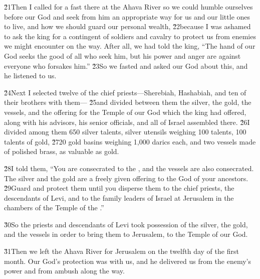 \v{21}Then I called for a fast there at the Ahava River so we could humble ourselves before our God and seek from him an appropriate way for us and our little ones to live, and how we should guard our personal wealth, \v{22}because I was ashamed to ask the king for a contingent of soldiers and cavalry to protect us from enemies we might encounter on the way. After all, we had told the king, ``The hand of our God seeks the good of all who seek him, but his power and anger are against everyone who forsakes him.'' \v{23}So we fasted and asked our God about this, and he listened to us.

\v{24}Next I selected twelve of the chief priests---Sherebiah, Hashabiah, and ten of their brothers with them--- \v{25}and divided between them the silver, the gold, the vessels, and the offering for the Temple of our God which the king had offered, along with his advisors, his senior officials, and all of Israel assembled there. \v{26}I divided among them 650 silver talents, silver utensils weighing 100 talents, 100 talents of gold, \v{27}20 gold basins weighing 1,000 darics each, and two vessels made of polished brass, as valuable as gold.

\v{28}I told them, ``You are consecrated to the , and the vessels are also consecrated. The silver and the gold are a freely given offering to the  God of your ancestors. \v{29}Guard and protect them until you disperse them to the chief priests, the descendants of Levi, and to the family leaders of Israel at Jerusalem in the chambers of the Temple of the .''

\v{30}So the priests and descendants of Levi took possession of the silver, the gold, and the vessels in order to bring them to Jerusalem, to the Temple of our God.

\v{31}Then we left the Ahava River for Jerusalem on the twelfth day of the first month. Our God's protection was with us, and he delivered us from the enemy's power and from ambush along the way.

